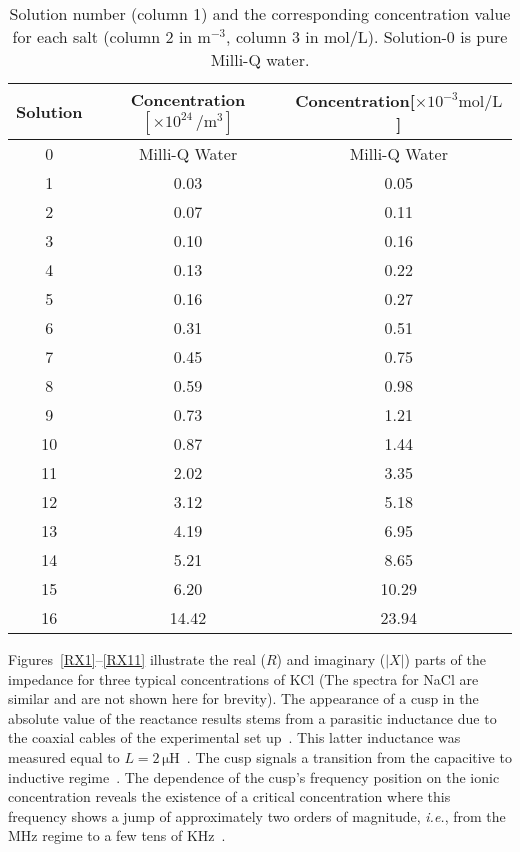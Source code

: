 \documentclass[preprint,aps,pre]{revtex4}
\begin{document}
\begin{table}
    \centering
   \caption{\label{tab:1} Solution number (column 1) and the corresponding concentration value for each salt (column 2 in $\mathrm{m^{-3}}$, column 3 in  $\mathrm{mol/L}$). Solution-0 is pure Milli-Q water.}
	
\begin{tabular}{ccc}
\hline
Solution & Concentration $[\times 10^{24}\,\mathrm{/m^3}]$ & Concentration{[}$\times 10^{-3}\mathrm{mol/L}${]}%
                          \\ \hline\hline
0                     &	Milli-Q Water &	Milli-Q Water \\ \hline
1                     &	0.03      &	0.05    \\ \hline
2                     &	0.07      &  0.11    \\ \hline
3                     &	0.10      &  0.16   	\\ \hline
4                     &	0.13      &  0.22    \\ \hline
5                     &	0.16      &  0.27    \\ \hline
6                     &	0.31      &  0.51    \\ \hline
7                     &	0.45       & 0.75     \\ \hline
8                     &	0.59      &  0.98     \\ \hline
9                     &	0.73      & 1.21    \\ \hline
10                    &	0.87      & 1.44   \\ \hline
11                    &	2.02       & 3.35     \\ \hline
12                    &	3.12      & 5.18     \\ \hline
13                    &	4.19       & 6.95    \\ \hline
14                    &	5.21       & 8.65     \\ \hline
15                    &	6.20      & 10.29   \\ \hline
16                    &	14.42     & 23.94   \\   \hline
\end{tabular}
\end{table}

Figures~\ref{RX1}--\ref{RX11} illustrate the real ($R$) and imaginary ($\left|X\right|$) parts of the impedance for three typical concentrations of KCl (The spectra for NaCl are similar and are not shown here for brevity). The appearance of a cusp in the absolute value of the reactance results stems from a parasitic inductance due to the coaxial cables of the experimental set up~\cite{JML}. This latter inductance was measured equal to $L=2\,\mathrm{\mu H}$~\cite{JML}. The cusp signals a transition from the capacitive to inductive regime~\cite{negative}. The dependence of the cusp's frequency position on the ionic concentration reveals the existence of a critical concentration where this frequency shows a jump of approximately two orders of magnitude, \emph{i.e.}, from the MHz regime to a few tens of KHz~\cite{JML}. 
\end{document}
